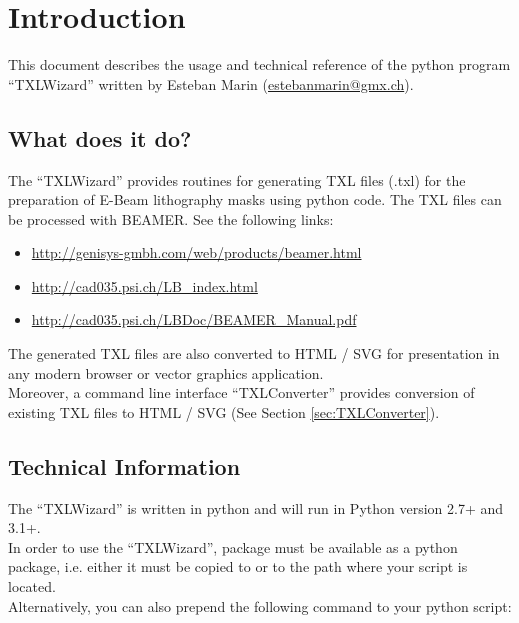 \section{Introduction}
    This document describes the usage and technical reference of the python program ``TXLWizard''
    written by Esteban Marin (\href{mailto:estebanmarin@gmx.ch}{estebanmarin@gmx.ch}).\\

    \subsection{What does it do?}
        The ``TXLWizard'' provides routines for generating TXL files (.txl) for
        the preparation of E-Beam lithography masks using python code. The TXL files can be processed with BEAMER.
        See the following links:
        \begin{itemize}
            \item \url{http://genisys-gmbh.com/web/products/beamer.html}
            \item \url{http://cad035.psi.ch/LB_index.html}
            \item \url{http://cad035.psi.ch/LBDoc/BEAMER_Manual.pdf}
        \end{itemize}
        The generated TXL files are also converted to HTML / SVG for presentation in any modern browser or
        vector graphics application.\\
        Moreover, a command line interface ``TXLConverter'' provides conversion of existing TXL files to HTML / SVG
        (See Section \ref{sec:TXLConverter}).


    \subsection{Technical Information}
        The ``TXLWizard'' is written in python and will run in Python version 2.7+ and 3.1+.\\
        In order to use the ``TXLWizard'', package must be available as
        a python package, i.e. either it must be copied to  or
        to the path where your script is located. \\
        Alternatively, you can also prepend the following command to your python script:\\
        \\
        



